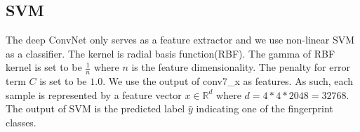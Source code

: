 \subsection{SVM}
The deep ConvNet only serves as a feature extractor and we use non-linear SVM as a classifier. The kernel is radial basis function(RBF). The gamma of RBF kernel  is set to be $\frac{1}{n}$ where $n$ is the feature dimensionality. The penalty for error term $C$ is set to be $1.0$. 
%
We use the output of  conv7\_x as features. As such, each sample is represented by a feature vector $x \in \mathbb{R}^d$ where $d=4*4*2048=32768$. The output of SVM is the predicted label $\hat{y} $ indicating one of the fingerprint classes.







